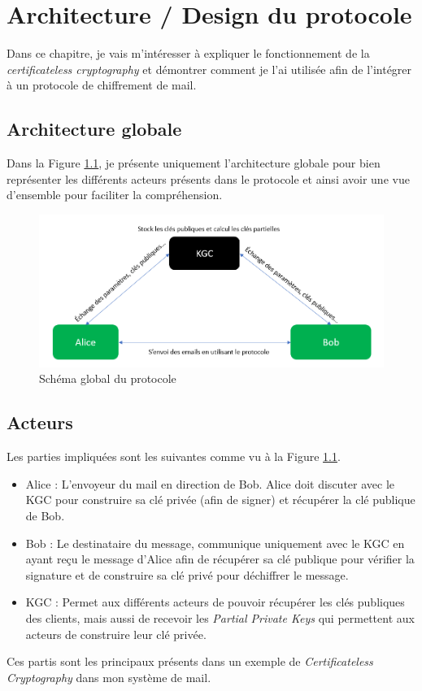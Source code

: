 \chapter{Architecture / Design du protocole}
\label{ch:arch}
Dans ce chapitre, je vais m'intéresser à expliquer le fonctionnement de la \textit{certificateless cryptography} et démontrer comment je l'ai utilisée afin de l'intégrer à un protocole de chiffrement de mail.
\section{Architecture globale}
Dans la Figure \ref{fig:globalProtocol}, je présente uniquement l'architecture globale pour bien représenter les différents acteurs présents dans le protocole et ainsi avoir une vue d'ensemble pour faciliter la compréhension.

\begin{figure}[h!]
	\centering
	\includegraphics[width=14cm]{images/SchemaGlobal.png}
	\caption{Schéma global du protocole}
	\label{fig:globalProtocol}
\end{figure}

\section{Acteurs}
Les parties impliquées sont les suivantes comme vu à la Figure \ref{fig:globalProtocol}.
\begin{itemize}
	\item Alice : L'envoyeur du mail en direction de Bob. Alice doit discuter avec le KGC pour construire sa clé privée (afin de signer) et récupérer la clé publique de Bob.
	\item Bob : Le destinataire du message, communique uniquement avec le KGC en ayant reçu le message d'Alice afin de récupérer sa clé publique pour vérifier la signature et de construire sa clé privé pour déchiffrer le message.
	\item KGC : Permet aux différents acteurs de pouvoir récupérer les clés publiques des clients, mais aussi de  recevoir les \textit{Partial Private Keys} qui permettent aux acteurs de construire leur clé privée. 
\end{itemize}
Ces partis sont les principaux présents dans un exemple de \textit{Certificateless Cryptography} dans mon système de mail.
